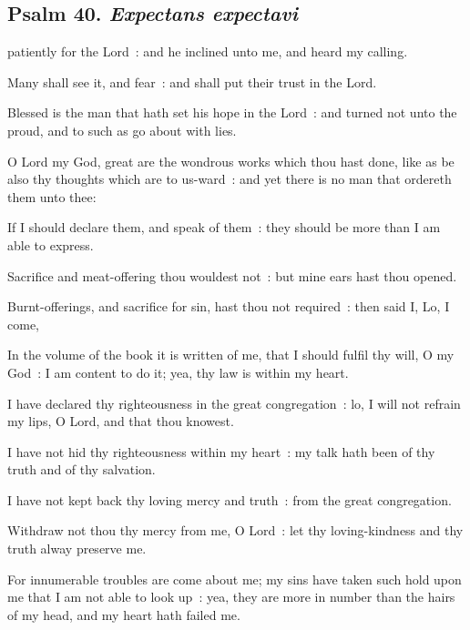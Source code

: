 \subsection{Psalm 40. \textit{Expectans expectavi}}


 patiently for the Lord~: and he inclined unto me, and heard my calling.\par
{}
Many shall see it, and fear~: and shall put their trust in the Lord.\par
{}Blessed is the man that hath set his hope in the Lord~: and turned not unto the proud, and to such as go about with lies.\par
{}O Lord my God, great are the wondrous works which thou hast done, like as be also thy thoughts which are to us-ward~: and yet there is no man that ordereth them unto thee:\par
{}If I should declare them, and speak of them~: they should be more than I am able to express.\par
{}Sacrifice and meat-offering thou wouldest not~: but mine ears hast thou opened.\par
{}Burnt-offerings, and sacrifice for sin, hast thou not required~: then said I, Lo, I come,\par
{}In the volume of the book it is written of me, that I should fulfil thy will, O my God~: I am content to do it; yea, thy law is within my heart.\par
{}I have declared thy righteousness in the great congregation~: lo, I will not refrain my lips, O Lord, and that thou knowest.\par
{}I have not hid thy righteousness within my heart~: my talk hath been of thy truth and of thy salvation.\par
{}I have not kept back thy loving mercy and truth~: from the great congregation.\par
{}Withdraw not thou thy mercy from me, O Lord~: let thy loving-kindness and thy truth alway preserve me.\par
{}For innumerable troubles are come about me; my sins have taken such hold upon me that I am not able to look up~: yea, they are more in number than the hairs of my head, and my heart hath failed me.\par
